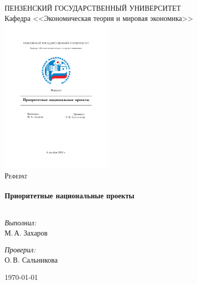 \begin{titlepage}
\begin{center}
  \textsc{\large ПЕНЗЕНСКИЙ ГОСУДАРСТВЕННЫЙ УНИВЕРСИТЕТ}\\[0.5cm]  
Кафедра <<Экономическая теория и мировая экономика>>\\[1.5cm]

\includegraphics[width=0.4\textwidth]{./NPR}\\[1cm]
\textsc{\Large Реферат}\\[0.5cm]
\HRule \\[0.4cm]
{ \LARGE \bfseries Приоритетные национальные проекты}\\[0.4cm]
\HRule \\[1.5cm]
\begin{minipage}{0.4\textwidth}
\begin{flushleft} \large
\emph{Выполнил:}\\
М.\,А. Захаров
\end{flushleft}
\end{minipage}
\begin{minipage}{0.4\textwidth}
\begin{flushright} \large
\emph{Проверил:} \\
О.\,В. Сальникова
\end{flushright}
\end{minipage}
\vfill
{\large \today}
\end{center}
\end{titlepage}

